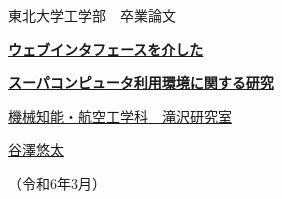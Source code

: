 \documentclass[a4paper,12pt,onecolumn,dvipdfmx]{jsarticle}
\begin{document}
	\begin{titlepage}
	\vspace*{3zw}
	\Large{東北大学工学部　卒業論文} \par
	\vspace*{5zw}
		\begin{center}
		  \huge{\textbf{\underline{ウェブインタフェースを介した}}} \par
		  \huge{\textbf{\underline{スーパコンピュータ利用環境に関する研究}}} \par
		  \vspace*{10zw}
		  \Large{\underline{機械知能・航空工学科　滝沢研究室}} \par
		  \vspace*{3zw}
		  \Large{\underline{谷澤悠太}} \par
		  \Large{（令和6年3月）} \par
		\end{center}
	\end{titlepage}
	

	\setcounter{tocdepth}{3}
	\tableofcontents%
	\clearpage%
	\listoffigures%
	\listoftables%
	\lstlistoflistings
	\clearpage
	
	
	
	
	

	
	
	
\end{document}
